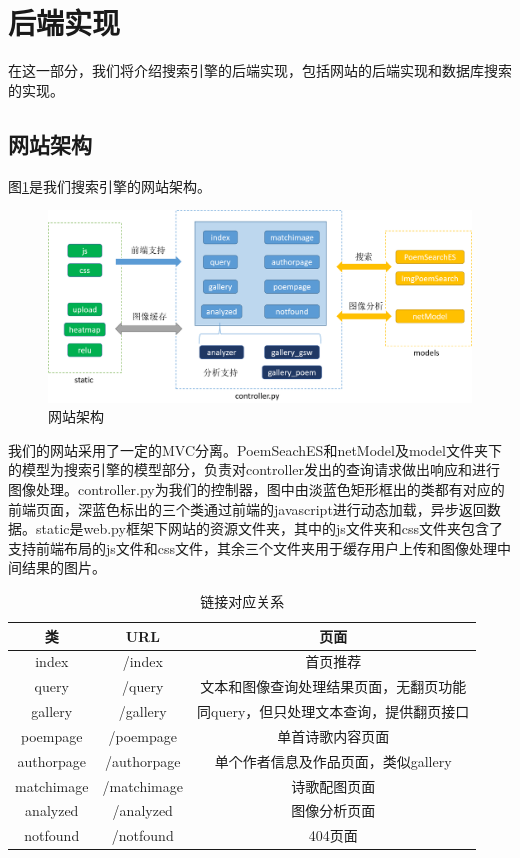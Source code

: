 \documentclass[a4paper, 10pt]{article}
\begin{document}
\section{后端实现}
在这一部分，我们将介绍搜索引擎的后端实现，包括网站的后端实现和数据库搜索的实现。

\subsection{网站架构}
图\ref{fig:web_struct}是我们搜索引擎的网站架构。

\begin{figure}[H]
\centering
\includegraphics[scale=0.48]{fig/web_struct.png}
\caption{网站架构}
\label{fig:web_struct}
\end{figure}

我们的网站采用了一定的MVC分离。PoemSeachES和netModel及model文件夹下的模型为搜索引擎的模型部分，负责对controller发出的查询请求做出响应和进行图像处理。controller.py为我们的控制器，图中由淡蓝色矩形框出的类都有对应的前端页面，深蓝色标出的三个类通过前端的javascript进行动态加载，异步返回数据。static是web.py框架下网站的资源文件夹，其中的js文件夹和css文件夹包含了支持前端布局的js文件和css文件，其余三个文件夹用于缓存用户上传和图像处理中间结果的图片。

\begin{table}[H]
\centering
\begin{tabular}{ccc}
\hline
\textbf{类} & \textbf{URL} & \textbf{页面} \\ \hline
index & /index & 首页推荐 \\
query & /query & 文本和图像查询处理结果页面，无翻页功能 \\ 
gallery & /gallery & 同query，但只处理文本查询，提供翻页接口 \\ 
poempage & /poempage & 单首诗歌内容页面 \\ 
authorpage & /authorpage & 单个作者信息及作品页面，类似gallery \\ 
matchimage & /matchimage & 诗歌配图页面 \\ 
analyzed & /analyzed & 图像分析页面 \\ 
notfound & /notfound & 404页面 \\ \hline
\end{tabular}
\caption{链接对应关系}
\label{tab:url_connect}
\end{table}
\end{document}
